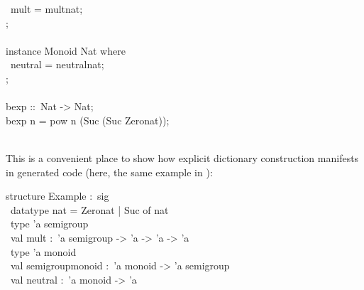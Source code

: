\begin{isabellebody}
\begin{isamarkuptext}
\hspace*{0pt} ~mult = mult{}nat;\\
\hspace*{0pt}{\char125};\\
\hspace*{0pt}\\
\hspace*{0pt}instance Monoid Nat where {}\\
\hspace*{0pt} ~neutral = neutral{}nat;\\
\hspace*{0pt}{\char125};\\
\hspace*{0pt}\\
\hspace*{0pt}bexp ::~Nat -> Nat;\\
\hspace*{0pt}bexp n = pow n (Suc (Suc Zero{}nat));\\
\hspace*{0pt}\\
\hspace*{0pt}{\char125}%
\end{isamarkuptext}%
\isamarkuptrue%
%
\endisatagquote
{\isafoldquote}%
%
\isadelimquote
%
\endisadelimquote
%
\begin{isamarkuptext}%
\noindent This is a convenient place to show how explicit dictionary construction
  manifests in generated code (here, the same example in ):%
\end{isamarkuptext}%
\isamarkuptrue%
%
\isadelimquote
%
\endisadelimquote
%
\isatagquote
%
\begin{isamarkuptext}%
\isatypewriter%
\noindent%
\hspace*{0pt}structure Example :~sig\\
\hspace*{0pt} ~datatype nat = Zero{}nat | Suc of nat\\
\hspace*{0pt} ~type 'a semigroup\\
\hspace*{0pt} ~val mult :~'a semigroup -> 'a -> 'a -> 'a\\
\hspace*{0pt} ~type 'a monoid\\
\hspace*{0pt} ~val semigroup{}monoid :~'a monoid -> 'a semigroup\\
\hspace*{0pt} ~val neutral :~'a monoid -> 'a\\

\end{isamarkuptext}
\end{isabellebody}
